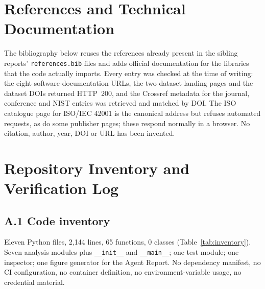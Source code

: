 \documentclass[11pt,a4paper]{article}
\newcommand{\code}[1]{\texttt{#1}}
\begin{document}
\section{References and Technical Documentation}
\label{sec:refs}
The bibliography below reuses the references already present in the sibling reports' \code{references.bib} files and adds official documentation for the libraries that the code actually imports. Every entry was checked at the time of writing: the eight software-documentation URLs, the two dataset landing pages and the dataset DOIs returned HTTP~200, and the Crossref metadata for the journal, conference and NIST entries was retrieved and matched by DOI. The ISO catalogue page for ISO/IEC 42001 is the canonical address but refuses automated requests, as do some publisher pages; these respond normally in a browser. No citation, author, year, DOI or URL has been invented.




\appendix
\section{Repository Inventory and Verification Log}
\label{app:log}

\subsection*{A.1 Code inventory}
Eleven Python files, 2{,}144 lines, 65 functions, 0 classes (Table~\ref{tab:inventory}). Seven analysis modules plus \code{\_\_init\_\_} and \code{\_\_main\_\_}; one test module; one inspector; one figure generator for the Agent Report. No dependency manifest, no CI configuration, no container definition, no environment-variable usage, no credential material.
\end{document}
